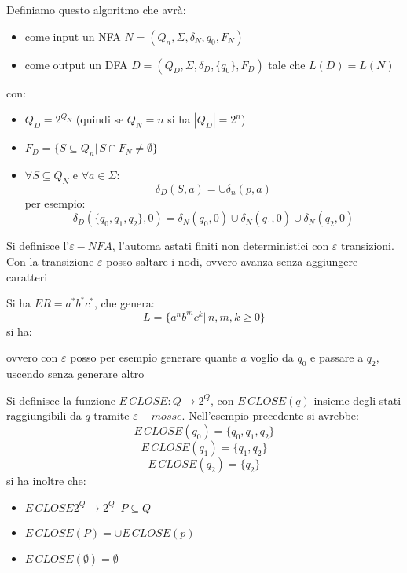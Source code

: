 Definiamo questo algoritmo che avrà:
\begin{itemize}
\item come input un NFA $N=(Q_n,\Sigma,\delta_N,q_0,F_N)$
\item come output un DFA $D=(Q_D,\Sigma,\delta_D,\{q_0\},F_D)$ tale che $L(D)=L(N)$
\end{itemize}
con:
\begin{itemize}
\item $Q_D=2^{Q_N}$ (quindi se $Q_N=n$ si ha $|Q_D|=2^n$)
\item $F_D=\{S\subseteq Q_n|\, S\cap F_N\neq \emptyset\}$
\item $\forall S\subseteq Q_N$ e $ \forall a \in\Sigma$:
$$\delta_D(S,a)=\cup \delta_n(p,a)$$
per esempio:
$$\delta_D(\{q_0,q_1,q_2\},0)=\delta_N(q_0,0)\cup \delta_N(q_1,0) \cup\delta_N(q_2,0) $$ 
\end{itemize}
Si definisce l'$\varepsilon-NFA$, l'automa astati finiti non deterministici con $\varepsilon$ transizioni. Con la transizione $\varepsilon$ posso saltare i nodi, ovvero avanza senza aggiungere caratteri
\begin{esempio}
Si ha $ER=a^*b^*c^*$, che genera:
$$L=\{a^nb^mc^k|\,n,m,k\geq 0\}$$
si ha:
\begin{center}
\end{center}
ovvero con $\varepsilon$ posso per esempio generare quante $a$ voglio da $q_0$ e passare a $q_2$, uscendo senza generare altro
\end{esempio}
Si definisce la funzione $E\,CLOSE:Q\to 2^Q$, con $E\,CLOSE(q)$ insieme degli stati raggiungibili da $q$ tramite $\varepsilon-mosse$. Nell'esempio precedente si avrebbe:
$$E\,CLOSE(q_0)=\{q_0,q_1,q_2\}$$
$$E\,CLOSE(q_1)=\{q_1,q_2\}$$
$$E\,CLOSE(q_2)=\{q_2\}$$
si ha inoltre che:
\begin{itemize}
\item $E\,CLOSE 2^Q\to 2^Q\,\,\, P\subseteq Q$
\item $E\,CLOSE(P)=\cup E\,CLOSE(p)$
\item $E\,CLOSE(\emptyset)=\emptyset$
\end{itemize}
